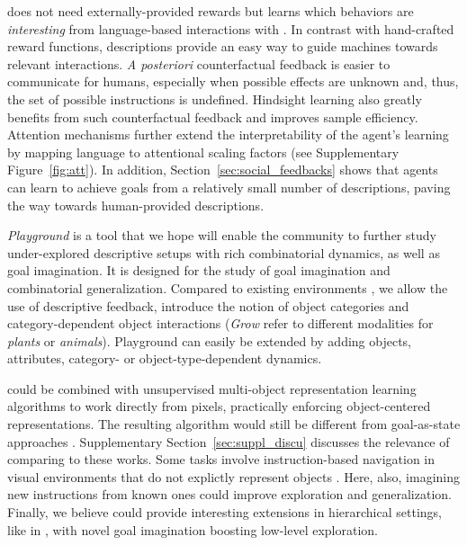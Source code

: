 \imagine does not need externally-provided rewards but learns which behaviors are \textit{interesting} from language-based interactions with \SP. In contrast with hand-crafted reward functions, \NL descriptions provide an easy way to guide machines towards relevant interactions. \textit{A posteriori} counterfactual feedback is easier to communicate for humans, especially when possible effects are unknown and, thus, the set of possible instructions is undefined. Hindsight learning also greatly benefits from such counterfactual feedback and improves sample efficiency.
Attention mechanisms further extend the interpretability of the agent's learning by mapping language to attentional scaling factors (see Supplementary Figure~\ref{fig:att}). In addition,  Section~\ref{sec:social_feedbacks} shows that agents can learn to achieve goals from a relatively small number of descriptions, paving the way towards human-provided descriptions. 

\textit{Playground} is a tool that we hope will enable the community to further study under-explored descriptive setups with rich combinatorial dynamics, as well as goal imagination. It is designed for the study of goal imagination and combinatorial generalization. Compared to existing environments \citep{Hermann2017,chevalier-boisvert2018babyai,chan2019actrce}, we allow the use of descriptive feedback, introduce the notion of object categories and category-dependent object interactions (\textit{Grow} refer to different modalities for \textit{plants} or \textit{animals}). Playground can easily be extended by adding objects, attributes, category- or object-type-dependent dynamics.

\imagine could be combined with unsupervised multi-object representation learning algorithms \cite{burgess2019monet, greff2019multi} to work directly from pixels, practically enforcing object-centered representations. The resulting algorithm would still be different from goal-as-state approaches \cite{nair2018visual,pong2019skew,nair2019contextual}. Supplementary Section~\ref{sec:suppl_discu} discusses the relevance of comparing \imagine to these works. Some tasks involve instruction-based navigation in visual environments that do not explictly represent objects \citep{nguyen2019vision,shridhar2020alfred}. Here, also, imagining new instructions from known ones could improve exploration and generalization. Finally, we believe \imagine could provide interesting extensions in hierarchical settings, like in \citet{Jiang2019}, with novel goal imagination boosting low-level exploration.

